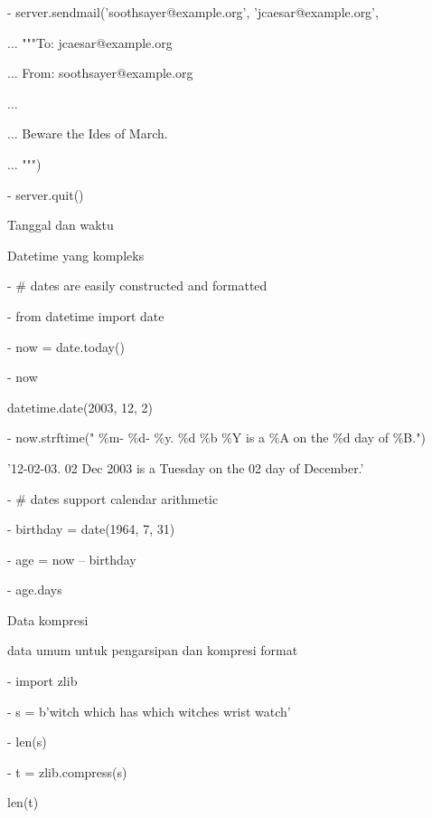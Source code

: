 \noindent 
- server.sendmail('soothsayer@example.org', 'jcaesar@example.org', \par
\noindent 
... """To: jcaesar@example.org \par
\noindent 
... From: soothsayer@example.org \par
\noindent 
... \par
\noindent 
... Beware the Ides of March. \par
\noindent 
... """) \par
\noindent 
- server.quit() \par
\noindent 
Tanggal dan waktu \par
\noindent 
Datetime yang kompleks \par
\noindent 
-  $  \#  $ dates are easily constructed and formatted \par
\noindent 
- from datetime import date \par
\noindent 
- now = date.today() \par
\noindent 
- now \par
\noindent 
datetime.date(2003, 12, 2) \par
\noindent 
- now.strftime(" $  \%  $m- $  \%  $d- $  \%  $y.  $  \%  $d  $  \%  $b  $  \%  $Y is a  $  \%  $A on the  $  \%  $d day of  $  \%  $B.") \par
\noindent 
'12-02-03. 02 Dec 2003 is a Tuesday on the 02 day of December.' \par
\noindent 
-  $  \#  $ dates support calendar arithmetic \par
\noindent 
- birthday = date(1964, 7, 31) \par
\noindent 
- age = now – birthday \par
\vspace{12pt}
\noindent 
- age.days \par
{} \par
\noindent 
Data kompresi  \par
\noindent 
data umum untuk pengarsipan dan kompresi format \par
\noindent 
- import zlib \par
\noindent 
- s = b'witch which has which witches wrist watch' \par
\noindent 
- len(s) \par
{} \par
\noindent 
- t = zlib.compress(s) \par
\noindent 
 len(t) \par
{} \par
\noindent 
